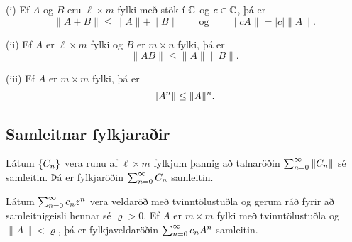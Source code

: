 \begin{se}\label{set5.4.3}  (i) Ef $A$ og $B$ eru
$\ell\times m$ fylki með stök í ${\mathbb C}$ og $c\in {\mathbb C}$, þá er
 $$\|A+B\|\leq \|A\|+\|B\| \qquad \text{og} \qquad
\|cA\|=|c|\|A\|.
 $$

\noindent 
(ii) Ef $A$ er $\ell\times m$ fylki og $B$ er $m\times n$ fylki, þá
er
 $$\|AB\|\leq \|A\|\|B\|.
 $$

\noindent
(iii) Ef $A$ er $m\times m$ fylki, þá er
 $$\|A\sp n\|\leq \|A\|\sp n.
 $$
\end{se}

\subsection*{Samleitnar fylkjaraðir}

\begin{se}\label{set5.4.4} Látum ${\{C_n\}}$ vera runu
af $\ell\times m$ fylkjum  þannig að talnaröðin $\sum_{n=0}\sp
\infty\|C_n\|$ sé samleitin.  Þá er fylkjaröðin $\sum_{n=0}\sp \infty
C_n$ samleitin.
\end{se}


\begin{fs}  Látum $\sum_{n=0}\sp \infty c_nz\sp n$ vera veldaröð með
tvinntölustuðla  og gerum ráð fyrir að samleitnigeisli hennar sé
${\varrho}>0$.  Ef $A$ er $m\times m$ fylki með tvinntölustuðla og 
$\|A\|<{\varrho}$,
þá er fylkjaveldaröðin $\sum_{n=0}\sp \infty c_nA\sp n$
samleitin.
\end{fs}



